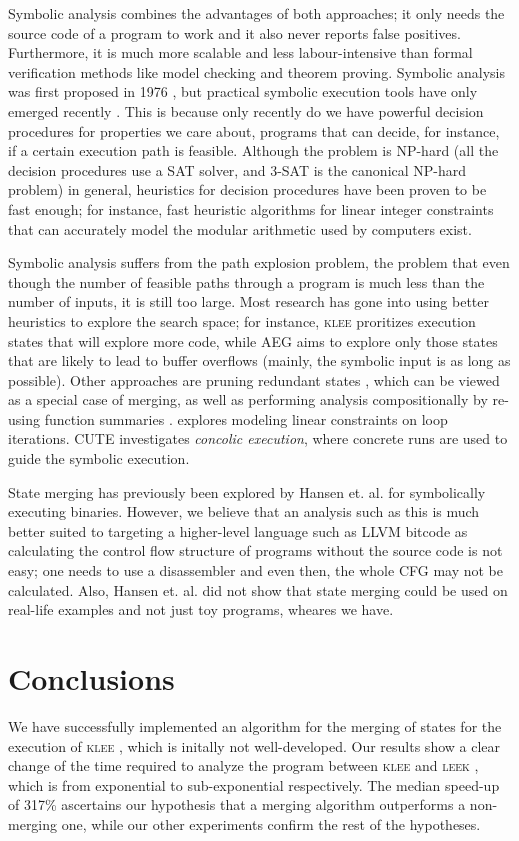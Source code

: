 \documentclass[12pt,a4paper]{article}
\newcommand{\klee}{\textsc{klee }}
\newcommand{\leek}{\textsc{leek }}
\begin{document}
Symbolic analysis combines the advantages of both approaches; it only needs the source code of a program to work and it also never reports false positives. Furthermore, it is much more scalable and less labour-intensive than formal verification methods like model checking and theorem proving. Symbolic analysis was first proposed in 1976 \cite{old}, but practical symbolic execution tools have only emerged recently \cite{klee}\cite{dart}. This is because only recently do we have powerful decision procedures \cite{bitvecarray} for properties we care about, programs that can decide, for instance, if a certain execution path is feasible. Although the problem is NP-hard (all the decision procedures use a SAT solver, and 3-SAT is the canonical NP-hard problem) in general, heuristics for decision procedures have been proven to be fast enough; for instance, fast heuristic algorithms for linear integer constraints that can accurately model the modular arithmetic used by computers exist.

Symbolic analysis suffers from the path explosion problem, the problem that even though the number of feasible paths through a program is much less than the number of inputs, it is still too large. Most research has gone into using better heuristics to explore the search space; for instance, \klee proritizes execution states that will explore more code, while AEG \cite{aeg} aims to explore only those states that are likely to lead to buffer overflows (mainly, the symbolic input is as long as possible). Other approaches are pruning redundant states \cite{rwset}, which can be viewed as a special case of merging, as well as performing analysis compositionally by re-using function summaries \cite{cdtg}. \cite{loopsum} explores modeling linear constraints on loop iterations. CUTE \cite{cute} investigates \emph{concolic execution}, where concrete runs are used to guide the symbolic execution.

State merging has previously been explored by Hansen et. al. \cite{statejoin} for symbolically executing binaries. However, we believe that an analysis such as this is much better suited to targeting a higher-level language such as LLVM bitcode as calculating the control flow structure of programs without the source code is not easy; one needs to use a disassembler and even then, the whole CFG may not be calculated. Also, Hansen et. al. did not show that state merging could be used on real-life examples and not just toy programs, wheares we have.

\section{Conclusions}\label{conclusions}
We have successfully implemented an algorithm for the merging of states for the execution of \klee, which is initally not well-developed. Our results show a clear change of the time required to analyze the program between \klee and \leek, which is from exponential to sub-exponential respectively. The median speed-up of 317\% ascertains our hypothesis that a merging algorithm outperforms a non-merging one, while our other experiments confirm the rest of the hypotheses.
\end{document}
